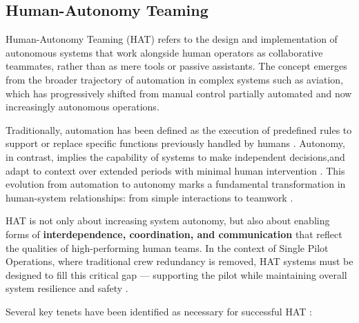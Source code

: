 \documentclass[12pt,a4paper]{article} %
\begin{document}
	\subsection{Human-Autonomy Teaming}

	Human-Autonomy Teaming (HAT) refers to the design and implementation of autonomous systems that work alongside human operators as collaborative teammates, rather than as mere tools or passive assistants. The concept emerges from the broader trajectory of automation in complex systems such as aviation, which has progressively shifted from manual control partially automated and now increasingly autonomous operations.

	Traditionally, automation has been defined as the execution of predefined rules to support or replace specific functions previously handled by humans \parencite{parasuraman_model_2000,hancock_imposing_2017,hoff_trust_2015}. Autonomy, in contrast, implies the capability of systems to make independent decisions,and adapt to context over extended periods with minimal human intervention \parencite{endsley_here_2017-1,holbrook_enabling_2020}. This evolution from automation to autonomy marks a fundamental transformation in human-system relationships: from simple interactions to teamwork \parencite{endsley_here_2017-1}.

	HAT is not only about increasing system autonomy, but also about enabling forms of \textbf{interdependence, coordination, and communication} that reflect the qualities of high-performing human teams. In the context of Single Pilot Operations, where traditional crew redundancy is removed, HAT systems must be designed to fill this critical gap — supporting the pilot while maintaining overall system resilience and safety \parencite{mcneese_chapter_2020}.

	Several key tenets have been identified as necessary for successful HAT \parencite{wynne_integrative_2018}:
\end{document}
